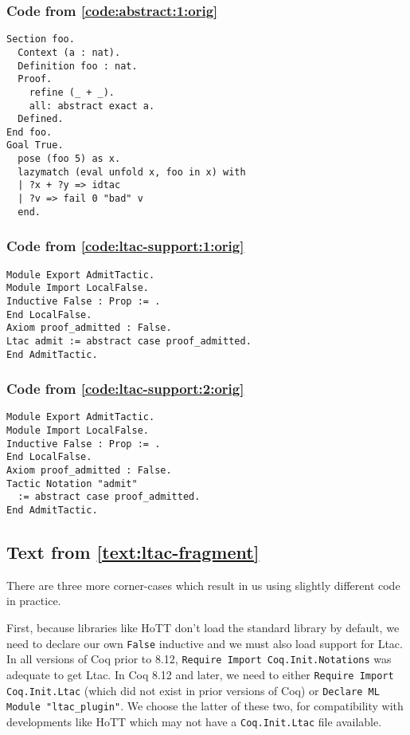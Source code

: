 \documentclass[a4paper,USenglish,cleveref,autoref,thm-restate]{lipics-v2021}
\begin{document}
\subsubsection{Code from \autoref{code:abstract:1:orig}}\label{code:abstract:1}
\begin{verbatim}
Section foo.
  Context (a : nat).
  Definition foo : nat.
  Proof.
    refine (_ + _).
    all: abstract exact a.
  Defined.
End foo.
Goal True.
  pose (foo 5) as x.
  lazymatch (eval unfold x, foo in x) with
  | ?x + ?y => idtac
  | ?v => fail 0 "bad" v
  end.
\end{verbatim}

\subsubsection{Code from \autoref{code:ltac-support:1:orig}}\label{code:ltac-support:1}
\begin{verbatim}
Module Export AdmitTactic.
Module Import LocalFalse.
Inductive False : Prop := .
End LocalFalse.
Axiom proof_admitted : False.
Ltac admit := abstract case proof_admitted.
End AdmitTactic.
\end{verbatim}
\subsubsection{Code from \autoref{code:ltac-support:2:orig}}\label{code:ltac-support:2}
\begin{verbatim}
Module Export AdmitTactic.
Module Import LocalFalse.
Inductive False : Prop := .
End LocalFalse.
Axiom proof_admitted : False.
Tactic Notation "admit"
  := abstract case proof_admitted.
End AdmitTactic.
\end{verbatim}


\subsection{Text from \autoref{text:ltac-fragment}}\label{text:ltac-fragment}
There are three more corner-cases which result in us using slightly different code in practice.

First, because libraries like HoTT don't load the standard library by default, we need to declare our own \verb|False| inductive and we must also load support for Ltac.
In all versions of Coq prior to 8.12, \verb|Require Import Coq.Init.Notations| was adequate to get Ltac.
In Coq 8.12 and later, we need to either \verb|Require Import Coq.Init.Ltac| (which did not exist in prior versions of Coq) or \verb|Declare ML Module "ltac_plugin"|.
We choose the latter of these two, for compatibility with developments like HoTT which may not have a \verb|Coq.Init.Ltac| file available.
\end{document}
